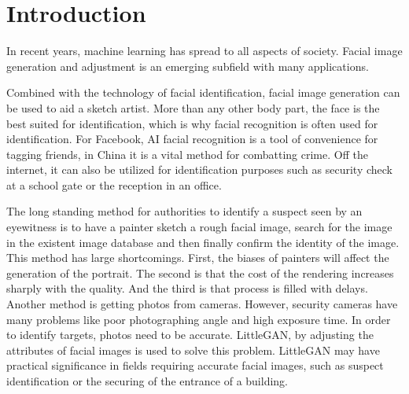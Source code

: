\section{Introduction}
In recent years, machine learning has spread to all aspects of society.
Facial image generation and adjustment is an emerging subfield with many applications.

Combined with the technology of facial identification,
    facial image generation can be used to aid a sketch artist.
More than any other body part, the face is the best suited for identification, which is why
facial recognition is often used for identification.
For Facebook, AI facial recognition is a tool of convenience for tagging friends,
    in China it is a vital method for combatting crime.
Off the internet, it can also be utilized for identification purposes such as security check at a school gate or the reception in an office.

The long standing method for authorities to identify a suspect seen by an eyewitness is to have a painter sketch a rough facial image,
    search for the image in the existent image database and then finally confirm the identity of the image.
This method has large shortcomings.
First, the biases of painters will affect the generation of the portrait.
The second is that the cost of the rendering increases sharply with the quality.
And the third is that process is filled with delays.
Another method is getting photos from cameras.
However, security cameras have many problems like poor photographing angle and high exposure time.
In order to identify targets, photos need to be accurate.
LittleGAN, by adjusting the attributes of facial images is used to solve this problem.
LittleGAN may have practical significance in fields requiring accurate facial images,
    such as suspect identification or the securing of the entrance of a building.